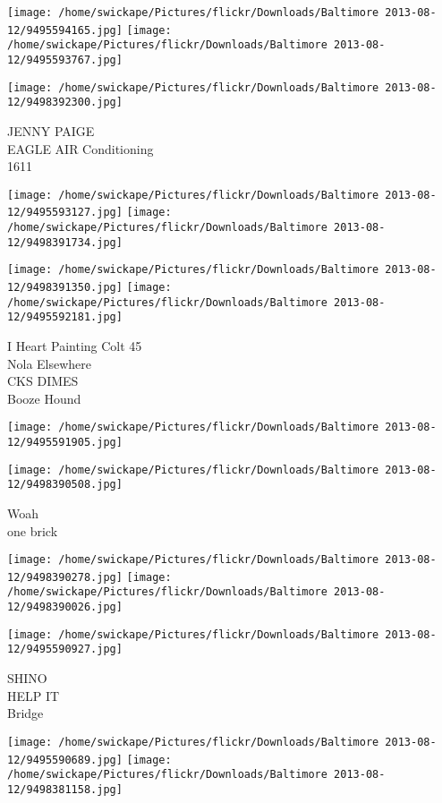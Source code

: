 \documentclass[10pt,letterpaper]{article}
\begin{document}
\texttt{[image: /home/swickape/Pictures/flickr/Downloads/Baltimore 2013-08-12/9495594165.jpg]}
\texttt{[image: /home/swickape/Pictures/flickr/Downloads/Baltimore 2013-08-12/9495593767.jpg]}

\vspace{0.25in}
\texttt{[image: /home/swickape/Pictures/flickr/Downloads/Baltimore 2013-08-12/9498392300.jpg]}

JENNY PAIGE\\
EAGLE AIR Conditioning\\
1611
\pagebreak

\texttt{[image: /home/swickape/Pictures/flickr/Downloads/Baltimore 2013-08-12/9495593127.jpg]}
\texttt{[image: /home/swickape/Pictures/flickr/Downloads/Baltimore 2013-08-12/9498391734.jpg]}

\texttt{[image: /home/swickape/Pictures/flickr/Downloads/Baltimore 2013-08-12/9498391350.jpg]}
\texttt{[image: /home/swickape/Pictures/flickr/Downloads/Baltimore 2013-08-12/9495592181.jpg]}

I Heart Painting Colt 45\\
Nola Elsewhere\\
CKS DIMES\\
Booze Hound
\pagebreak

\texttt{[image: /home/swickape/Pictures/flickr/Downloads/Baltimore 2013-08-12/9495591905.jpg]}

\vspace{0.25in}
\texttt{[image: /home/swickape/Pictures/flickr/Downloads/Baltimore 2013-08-12/9498390508.jpg]}

Woah\\
one brick
\pagebreak

\texttt{[image: /home/swickape/Pictures/flickr/Downloads/Baltimore 2013-08-12/9498390278.jpg]}
\texttt{[image: /home/swickape/Pictures/flickr/Downloads/Baltimore 2013-08-12/9498390026.jpg]}

\vspace{0.25in}
\texttt{[image: /home/swickape/Pictures/flickr/Downloads/Baltimore 2013-08-12/9495590927.jpg]}

SHINO\\
HELP IT\\
Bridge
\pagebreak

\texttt{[image: /home/swickape/Pictures/flickr/Downloads/Baltimore 2013-08-12/9495590689.jpg]}
\texttt{[image: /home/swickape/Pictures/flickr/Downloads/Baltimore 2013-08-12/9498381158.jpg]}
\end{document}
